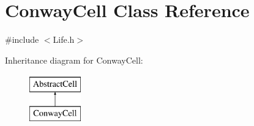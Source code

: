 \hypertarget{classConwayCell}{\section{Conway\-Cell Class Reference}
\label{classConwayCell}
}


{\ttfamily \#include $<$Life.\-h$>$}

Inheritance diagram for Conway\-Cell\-:\begin{figure}[H]
\begin{center}
\leavevmode
\includegraphics[height=2.000000cm]{classConwayCell}
\end{center}
\end{figure}
